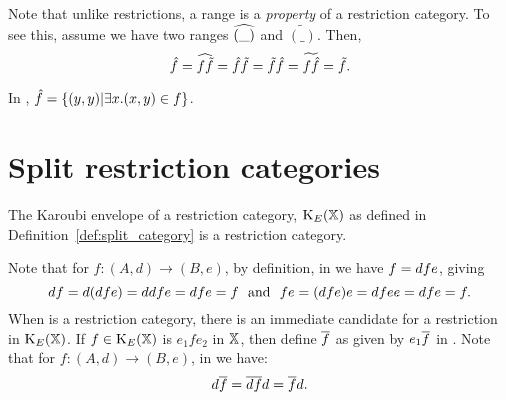 Note that unlike restrictions, a range is a \emph{property} of a restriction category. To see
this, assume we have two ranges $\widehat{(\_)}$ and $\widetilde{(\_)}$. Then,
\[\hat{f}=\widehat{f \tilde{f}}=\hat{f} \tilde{f}=\tilde{f} \hat{f}=\widetilde{f \hat{f}}=\tilde{f}.\]

\begin{example}\label{ex:ranges}
   In \pinj, $\hat{f} = \{(y,y) | \exists x. (x,y) \in f\}$.
\end{example}
\section{Split restriction categories} %
\label{sub:split_restriction_categories}

The Karoubi envelope of a restriction category, $\text{K}_{E}(\mathbb{X})$ as defined in
Definition~\ref{def:split_category} is a restriction category.

Note that for $f:(A,d)\to(B,e)$, by definition, in \X we have $f=d\hspace{0.1pt} f e$, giving
\[
  d\hspace{0.1pt} f = d(d\hspace{0.1pt} f e) = d\hspace{0.1pt} d\hspace{0.1pt} f e = d\hspace{0.1pt} f e =f\
  \text{ and }\  f e = (d\hspace{0.1pt} f e)e = d\hspace{0.1pt} f e\hspace{0.1pt} e = d\hspace{0.1pt} f e = f.
\]
When \X is a restriction category, there is an immediate candidate for a restriction in
$\text{K}_{E}(\mathbb{X})$. If $f\in\text{K}_{E}(\mathbb{X})$ is $e_1 f e_2$ in $\mathbb{X}$, then define $\overline{f}$ as
given by $e_1 \overline{f}$ in \X. Note that for $f:(A,d)\to(B,e)$, in \X we have:
\[
  d\hspace{0.1pt}\overline{f} = \overline{d\hspace{0.1pt} f} d = \overline{f} d.
\]

